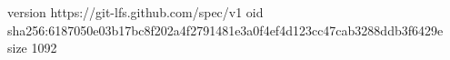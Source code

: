 version https://git-lfs.github.com/spec/v1
oid sha256:6187050e03b17bc8f202a4f2791481e3a0f4ef4d123cc47cab3288ddb3f6429e
size 1092
